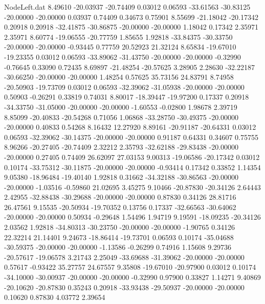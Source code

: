 \begin{filecontents}{NodeLeft.dat}
   8.49610  -20.03937  -20.74409     0.03012    0.06593  -33.61563  -30.83125  -20.00000  -20.00000    0.03937    0.74409    0.34673    0.75901
   8.55699  -21.18042  -20.17342     0.20918    0.20918  -32.41875  -30.86875  -20.00000  -20.00000    1.18042    0.17342    2.35971    2.35971
   8.60774  -19.06555  -20.77759     1.85655    1.92818  -33.84375  -30.33750  -20.00000  -20.00000   -0.93445    0.77759   20.52923   21.32124
   8.65834  -19.67010  -19.23355     0.03012    0.06593  -33.89062  -31.43750  -20.00000  -20.00000   -0.32990   -0.76645    0.33090    0.72435
   8.69897  -21.48254  -20.57625     3.28905    2.28630  -32.22187  -30.66250  -20.00000  -20.00000    1.48254    0.57625   35.73156   24.83791
   8.74958  -20.50903  -19.73709     0.03012    0.06593  -32.39062  -31.05938  -20.00000  -20.00000    0.50903   -0.26291    0.33819    0.74031
   8.80017  -18.39447  -19.97200     0.17337    0.20918  -34.33750  -31.05000  -20.00000  -20.00000   -1.60553   -0.02800    1.98678    2.39719
   8.85099  -20.40833  -20.54268     0.71056    1.06868  -33.28750  -30.49375  -20.00000  -20.00000    0.40833    0.54268    8.16432   12.27920
   8.89161  -20.91187  -20.64331     0.03012    0.06593  -32.39062  -30.14375  -20.00000  -20.00000    0.91187    0.64331    0.34607    0.75755
   8.96266  -20.27405  -20.74409     2.32212    2.35793  -32.62188  -29.83438  -20.00000  -20.00000    0.27405    0.74409   26.62097   27.03153
   9.00313  -19.06586  -20.17342     0.03012    0.10174  -33.75312  -30.11875  -20.00000  -20.00000   -0.93414    0.17342    0.33852    1.14354
   9.05380  -18.96484  -19.40140     1.92818    0.31662  -34.32188  -30.86563  -20.00000  -20.00000   -1.03516   -0.59860   21.02695    3.45275
   9.10466  -20.87830  -20.34126     2.64443    2.42955  -32.88438  -30.29688  -20.00000  -20.00000    0.87830    0.34126   28.81716   26.47561
   9.15535  -20.50934  -19.70352     0.13756    0.17337  -32.66563  -30.64062  -20.00000  -20.00000    0.50934   -0.29648    1.54496    1.94719
   9.19591  -18.09235  -20.34126     2.03562    1.92818  -34.80313  -30.23750  -20.00000  -20.00000   -1.90765    0.34126   22.32214   21.14401
   9.24673  -18.86414  -19.73701     0.06593    0.10174  -35.04688  -30.59375  -20.00000  -20.00000   -1.13586   -0.26299    0.74916    1.15608
   9.29736  -20.57617  -19.06578     3.21743    2.25049  -33.69688  -31.39062  -20.00000  -20.00000    0.57617   -0.93422   35.27757   24.67557
   9.35808  -19.67010  -20.97900     0.03012    0.10174  -34.10000  -30.00937  -20.00000  -20.00000   -0.32990    0.97900    0.33827    1.14271
   9.40869  -20.10620  -20.87830     0.35243    0.20918  -33.93438  -29.50937  -20.00000  -20.00000    0.10620    0.87830    4.03772    2.39654

\end{filecontents}
